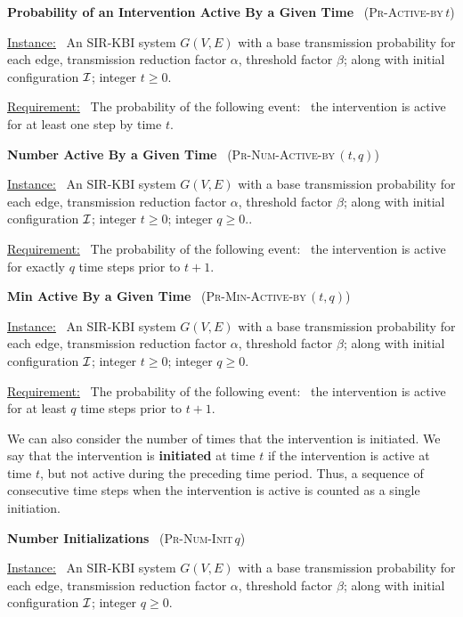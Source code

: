\documentclass[11pt]{article}
\newcommand{\cali}{\mbox{${\cal I}$}}
\newcommand{\tActiveBy}{\mbox{\textsc{Pr-Active-by}$\,t$}}
\newcommand{\NumInits}{\mbox{\textsc{Pr-Num-Init}$\,q$}}
\newcommand{\NumActiveBy}{\mbox{\textsc{Pr-Num-Active-by}$\,(t,q)$}}
\newcommand{\MinActiveBy}{\mbox{\textsc{Pr-Min-Active-by}$\,(t,q)$}}
\begin{document}
\bigskip

\noindent
\textbf{Probability of an Intervention Active By a Given Time}~ (\tActiveBy)

\medskip
\noindent
\underline{Instance:}~ An SIR-KBI system $G(V,E)$ with a base transmission probability for each edge,
transmission reduction factor $\alpha$, threshold factor $\beta$;
along with initial configuration \cali; integer $t \geq 0$.

\smallskip
\noindent
\underline{Requirement:}~ The probability of the following
event:~ the intervention is active for at least one step by time $t$.



\bigskip

\noindent
\textbf{Number Active By a Given Time}~ (\NumActiveBy)

\medskip
\noindent
\underline{Instance:}~ An SIR-KBI system $G(V,E)$ with a base transmission probability for each edge,
transmission reduction factor $\alpha$, threshold factor $\beta$;
along with initial configuration \cali; integer $t \geq 0$; integer $q \geq 0$..

\smallskip
\noindent
\underline{Requirement:}~ The probability of the following
event:~ the intervention is active for exactly $q$ time steps prior to $t+1$.


\bigskip

\noindent
\textbf{Min Active By a Given Time}~ (\MinActiveBy)

\medskip
\noindent
\underline{Instance:}~ An SIR-KBI system $G(V,E)$ with a base transmission probability for each edge,
transmission reduction factor $\alpha$, threshold factor $\beta$;
along with initial configuration \cali; integer $t \geq 0$; integer $q \geq 0$.

\smallskip
\noindent
\underline{Requirement:}~ The probability of the following
event:~ the intervention is active for at least $q$ time steps prior to $t+1$.


\bigskip

We can also consider the number of times that the intervention is initiated.
We say that the intervention is {\bf initiated} at time $t$ if the intervention is active at time $t$,
but not active during the preceding time period.
Thus, a sequence of consecutive time steps when the intervention is active is counted
as a single initiation.

\bigskip
\noindent
\textbf{Number Initializations}~ (\NumInits)

\medskip
\noindent
\underline{Instance:}~ An SIR-KBI system $G(V,E)$ with a base transmission probability for each edge,
transmission reduction factor $\alpha$, threshold factor $\beta$;
along with initial configuration \cali; integer $q \geq 0$.
\end{document}

